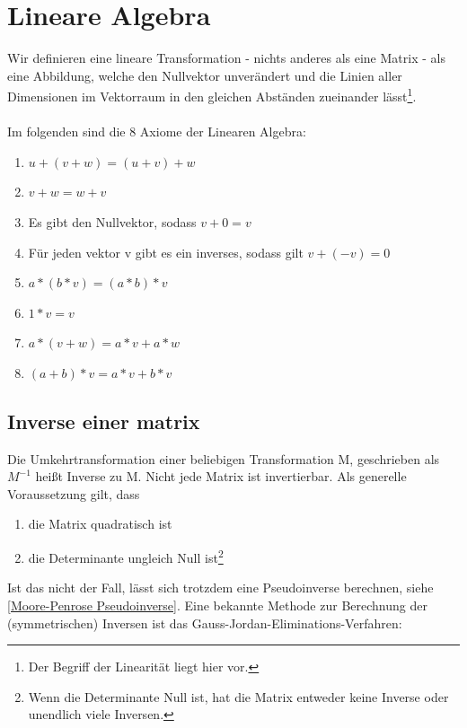\documentclass[letterpaper, titlepage]{article}
\begin{document}
\vspace{0.7cm}

\section{Lineare Algebra}\label{Lineare Algebra}
Wir definieren eine lineare Transformation - nichts anderes als eine Matrix - als eine Abbildung, welche den Nullvektor unverändert und die Linien aller Dimensionen im Vektorraum in den gleichen Abständen zueinander lässt\footnote[1]{Der Begriff der Linearität liegt hier vor.}.
\\
\vspace{0.1cm}
\\
Im folgenden sind die 8 Axiome der Linearen Algebra:
\begin{enumerate}
    \item $u+(v+w)=(u+v)+w$
    \item $v+w=w+v$
    \item Es gibt den Nullvektor, sodass $v+0=v$
    \item Für jeden vektor v gibt es ein inverses, sodass gilt $v+(-v)=0$
    \item $a*(b*v)=(a*b)*v$
    \item $1*v=v$
    \item $a*(v+w)=a*v+a*w$
    \item $(a+b)*v=a*v+b*v$
\end{enumerate}

\vspace{0.7cm}

\subsection{Inverse einer matrix}\label{Inverse einer matrix}
Die Umkehrtransformation einer beliebigen Transformation M, geschrieben als $M^{-1}$ heißt Inverse zu M. Nicht jede Matrix ist invertierbar. Als generelle Voraussetzung gilt, dass
\begin{enumerate}
    \item die Matrix quadratisch ist
    \item die Determinante ungleich Null ist\footnote{Wenn die Determinante Null ist, hat die Matrix entweder keine Inverse oder unendlich viele Inversen.}
\end{enumerate}

Ist das nicht der Fall, lässt sich trotzdem eine Pseudoinverse berechnen, siehe \ref{Moore-Penrose Pseudoinverse}. Eine bekannte Methode zur Berechnung der (symmetrischen) Inversen ist das Gauss-Jordan-Eliminations-Verfahren:
\end{document}

